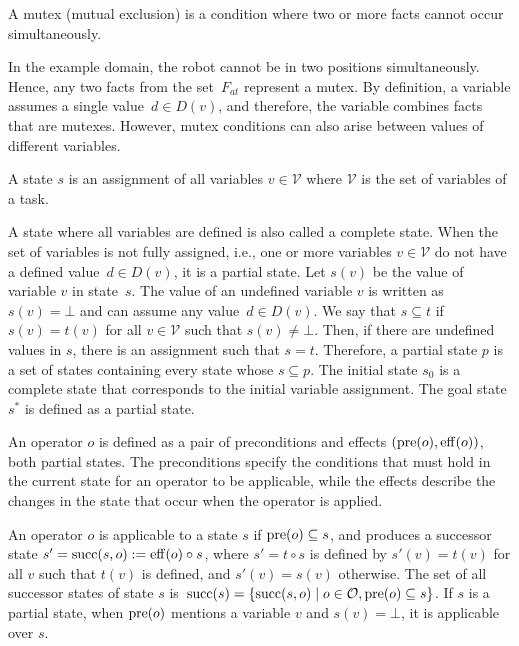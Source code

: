 \begin{definition}[Mutex]\label{def:mutex}
    A mutex (mutual exclusion) is a condition where two or more facts cannot occur simultaneously.
\end{definition}

In the example domain, the robot cannot be in two positions simultaneously. Hence, any two facts from the set~$F_{at}$ represent a mutex. By definition, a variable assumes a single value~$d \in D(v)$, and therefore, the variable combines facts that are mutexes. However, mutex conditions can also arise between values of different variables.

\begin{definition}[State]\label{def:state}
    A state $s$ is an assignment of all variables $v \in \mathcal{V}$ where $\mathcal{V}$ is the set of variables of a task.
\end{definition}

A state where all variables are defined is also called a complete state. When the set of variables is not fully assigned, i.e., one or more variables $v \in \mathcal{V}$ do not have a defined value~$d \in D(v)$, it is a partial state. Let $s(v)$ be the value of variable $v$ in state~$s$. The value of an undefined variable $v$ is written as $s(v) = \bot$ and can assume any value~$d \in D(v)$. We say that $s \subseteq t$ if $s(v) = t(v)$ for all $v \in \mathcal{V}$ such that $s(v) \neq \bot$. Then, if there are undefined values in $s$, there is an assignment such that $s = t$. Therefore, a partial state $p$ is a set of states containing every state whose $s \subseteq p$. The initial state $s_0$ is a complete state that corresponds to the initial variable assignment. The goal state $s^*$ is defined as a partial state.

\begin{definition}[Operator]\label{def:operator}
    An operator $o$ is defined as a pair of preconditions and effects $(\operatorname{pre}(o),\operatorname{eff}(o))$, both partial states. The preconditions specify the conditions that must hold in the current state for an operator to be applicable, while the effects describe the changes in the state that occur when the operator is applied.
\end{definition}

An operator $o$ is applicable to a state $s$ if $\operatorname{pre}(o) \subseteq s$, and produces a successor state $s' = \operatorname{succ}(s,o) := \operatorname{eff}(o) \circ s$, where $s' = t \circ s$ is defined by $s'(v) = t(v)$ for all $v$ such that $t(v)$ is defined, and $s'(v) = s(v)$ otherwise. The set of all successor states of state $s$ is~$\operatorname{succ}(s)=\{\operatorname{succ}(s,o)\mid o\in \mathcal{O}, \operatorname{pre}(o) \subseteq s\}$. If $s$ is a partial state, when $\operatorname{pre}(o)$ mentions a variable $v$ and $s(v) = \bot$, it is applicable over $s$.

